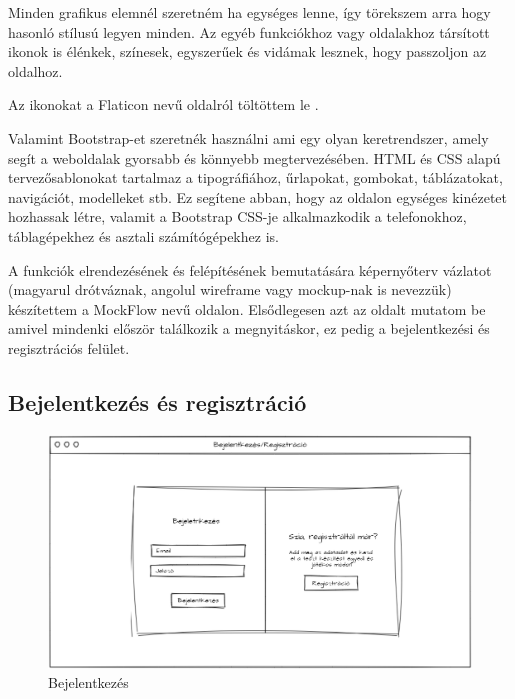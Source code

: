 Minden grafikus elemnél szeretném ha egységes lenne, így törekszem arra hogy hasonló stílusú legyen minden. Az egyéb funkciókhoz vagy oldalakhoz társított ikonok is élénkek, színesek, egyszerűek és vidámak lesznek, hogy passzoljon az oldalhoz. \newline

Az ikonokat a Flaticon nevű oldalról töltöttem le \cite{flaticon}.  \newline

Valamint Bootstrap-et szeretnék használni ami egy olyan keretrendszer, amely segít a weboldalak gyorsabb és könnyebb megtervezésében. HTML és CSS alapú tervezősablonokat tartalmaz a tipográfiához, űrlapokat, gombokat, táblázatokat, navigációt, modelleket stb. Ez segítene abban, hogy az oldalon egységes kinézetet hozhassak létre, valamit a Bootstrap CSS-je alkalmazkodik a telefonokhoz, táblagépekhez és asztali számítógépekhez is.


A funkciók elrendezésének és felépítésének bemutatására képernyőterv vázlatot (magyarul drótváznak, angolul wireframe vagy mockup-nak is nevezzük) készítettem a MockFlow \cite{mockflow} nevű oldalon.
Elsődlegesen azt az oldalt mutatom be amivel mindenki először találkozik a megnyitáskor, ez pedig a bejelentkezési és regisztrációs felület.

\subsection{Bejelentkezés és regisztráció}

\begin{figure}[H]
    \centering
    \includegraphics[width=\linewidth]{images/login_wireframe.png}
    \caption{Bejelentkezés}
    \label{fig:login_wireframe}
\end{figure}

